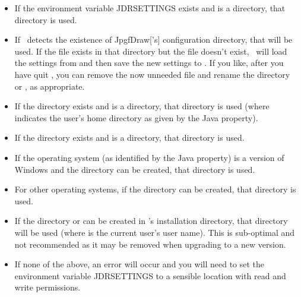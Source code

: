 \begin{itemize}
  \item If the environment variable \gls{JDRSETTINGS} exists
        and is a directory, that directory is used.

  \item If \FlowframTk\ detects the existence of \gls{JpgfDraw}['s]
        configuration directory, that will be used. If the file
         exists in that directory but the file
         doesn't exist, \FlowframTk\ will load the
        settings from  and then save the new settings to
        . If you like, after you have quit
        \FlowframTk, you can remove the now unneeded file
         and rename the directory  or
        , as appropriate.

  \item If the directory  exists
        and is a directory, that directory is used (where
         indicates the user's home directory as given
        by the Java  property).

  \item If the directory  exists
        and is a directory, that directory is used.

  \item If the operating system (as identified by the Java 
        property) is a version of Windows and the
        directory  can
        be created, that directory is used.

  \item For other operating systems, if the directory
         can be created, that
        directory is used.

  \item If the directory  or
         can be created in \FlowframTk's
        installation directory, that directory will be used
        (where  is the current user's user name). This is
        sub-optimal and not recommended as it may be removed when
        upgrading to a new version.

  \item If none of the above, an error will occur and you will need
        to set the environment variable \gls{JDRSETTINGS} to
        a sensible location with read and write permissions.

\end{itemize}

